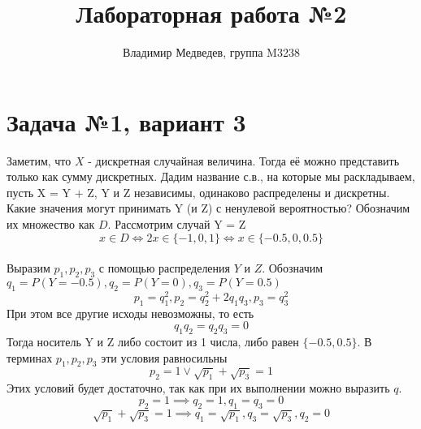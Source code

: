 \documentclass{article}
\title{Лабораторная работа №2}
\author{Владимир Медведев, группа M3238}
\date{}
\begin{document}
\maketitle

\section*{Задача №1, вариант 3}

Заметим, что $X$ - дискретная случайная величина. Тогда её можно представить только как сумму дискретных. Дадим название с.в., на которые мы раскладываем, пусть X = Y + Z, Y и Z независимы, одинаково распределены и дискретны. Какие значения могут принимать Y (и Z) с ненулевой вероятностью? Обозначим их множество как $D$. Рассмотрим случай Y = Z \\

\[ x \in D \iff 2x \in \{-1, 0, 1 \} \iff x \in \{-0.5, 0, 0.5\} \] \\

Выразим $p_1, p_2, p_3$ с помощью распределения $Y$ и $Z$. Обозначим $q_1 = P(Y = -0.5), q_2 = P(Y = 0), q_3 = P(Y = 0.5)$ \\
\[ p_1 = q_1^2, p_2 = q_2^2 + 2 q_1 q_3, p_3 = q_3^2\]
При этом все другие исходы невозможны, то есть
\[ q_1q_2=q_2q_3 = 0 \]
Тогда носитель Y и Z либо состоит из 1 числа, либо равен $ \{ -0.5, 0.5 \} $. В терминах $p_1, p_2, p_3$ эти условия равносильны 
\[ p_2 = 1 \lor \sqrt{p_1} + \sqrt{p_3} = 1 \]
Этих условий будет достаточно, так как при их выполнении можно выразить $q$. 
\[ p_2 = 1 \implies q_2 = 1, q_1 = q_3 = 0 \]
\[ \sqrt{p_1} + \sqrt{p_3} = 1 \implies q_1 = \sqrt{p_1}, q_3 = \sqrt{p_3}, q_2 = 0 \]
    
\end{document}

